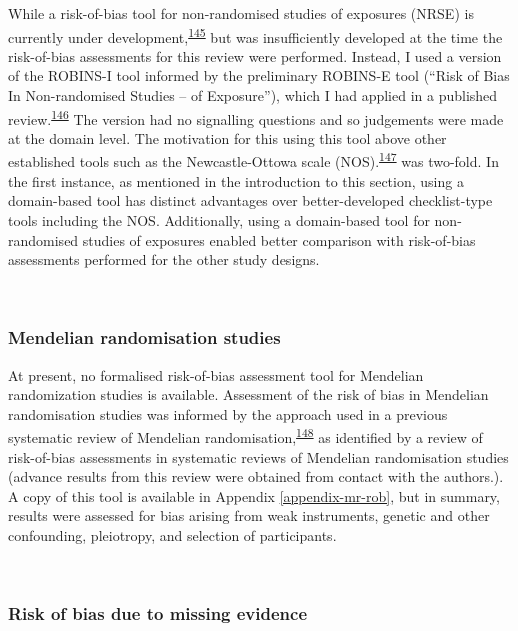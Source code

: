 \documentclass[a4paper, twoside]{templates/ociamthesis}
\begin{document}
While a risk-of-bias tool for non-randomised studies of exposures (NRSE) is currently under development,\textsuperscript{\protect\hyperlink{ref-morganr2020}{145}} but was insufficiently developed at the time the risk-of-bias assessments for this review were performed. Instead, I used a version of the ROBINS-I tool informed by the preliminary ROBINS-E tool (``Risk of Bias In Non-randomised Studies -- of Exposure''), which I had applied in a published review.\textsuperscript{\protect\hyperlink{ref-french2019}{146}} The version had no signalling questions and so judgements were made at the domain level. The motivation for this using this tool above other established tools such as the Newcastle-Ottowa scale (NOS).\textsuperscript{\protect\hyperlink{ref-wells2000}{147}} was two-fold. In the first instance, as mentioned in the introduction to this section, using a domain-based tool has distinct advantages over better-developed checklist-type tools including the NOS. Additionally, using a domain-based tool for non-randomised studies of exposures enabled better comparison with risk-of-bias assessments performed for the other study designs.

~

\hypertarget{mendelian-randomisation-studies}{%
\subsubsection{Mendelian randomisation studies}\label{mendelian-randomisation-studies}}

At present, no formalised risk-of-bias assessment tool for Mendelian randomization studies is available. Assessment of the risk of bias in Mendelian randomisation studies was informed by the approach used in a previous systematic review of Mendelian randomisation,\textsuperscript{\protect\hyperlink{ref-mamluk2020}{148}} as identified by a review of risk-of-bias assessments in systematic reviews of Mendelian randomisation studies (advance results from this review were obtained from contact with the authors.). A copy of this tool is available in Appendix \ref{appendix-mr-rob}, but in summary, results were assessed for bias arising from weak instruments, genetic and other confounding, pleiotropy, and selection of participants.

~

\hypertarget{risk-of-bias-due-to-missing-evidence}{%
\subsubsection{Risk of bias due to missing evidence}\label{risk-of-bias-due-to-missing-evidence}}
\end{document}
